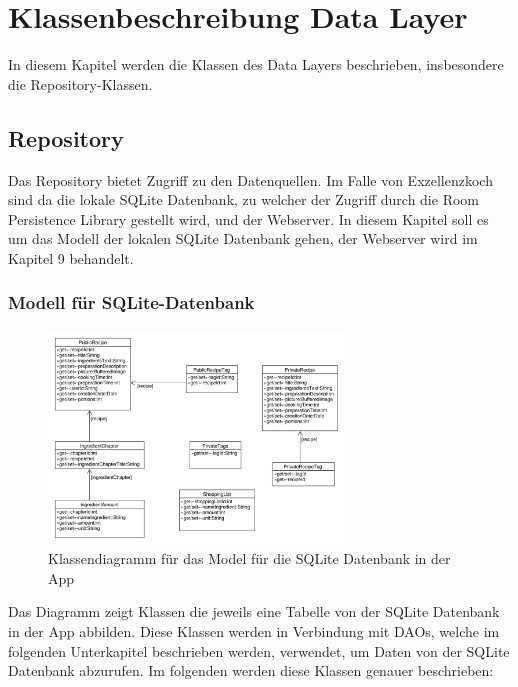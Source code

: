 \chapter{Klassenbeschreibung Data Layer}

In diesem Kapitel werden die Klassen des Data Layers beschrieben, insbesondere die Repository-Klassen.

\section{Repository}

Das Repository bietet Zugriff zu den Datenquellen. Im Falle von Exzellenzkoch sind da die lokale SQLite Datenbank, zu welcher der Zugriff durch die Room Persistence Library gestellt wird, und der Webserver.
In diesem Kapitel soll es um das Modell der lokalen SQLite Datenbank gehen, der Webserver wird im Kapitel 9 behandelt.

\subsection{Modell für SQLite-Datenbank}

\begin{figure}[H]
\centering
\includegraphics[width=0.7\textwidth]{pics/AppSqLiteObjects.pdf}%
\caption{Klassendiagramm für das Model für die SQLite Datenbank in der App}%
\end{figure}

Das Diagramm zeigt Klassen die jeweils eine Tabelle von der SQLite Datenbank in der App abbilden. Diese Klassen werden in Verbindung mit DAOs, welche im folgenden Unterkapitel beschrieben werden, verwendet, um Daten von der SQLite Datenbank abzurufen. %
Im folgenden werden diese Klassen genauer beschrieben:

